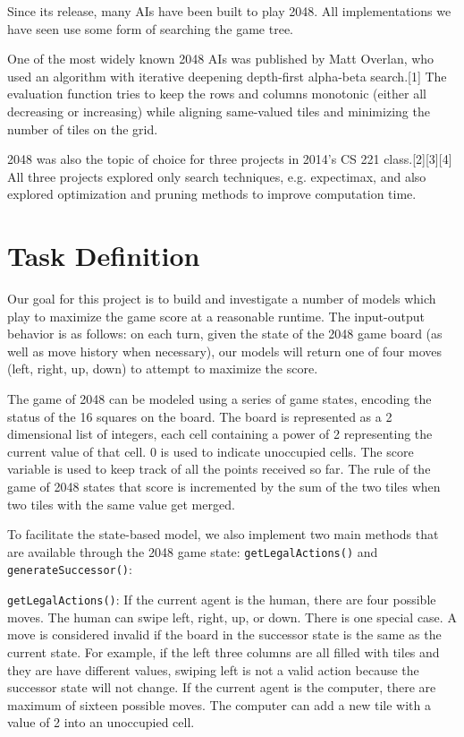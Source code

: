 \documentclass[9pt,twocolumn]{article}
\begin{document}
Since its release, many AIs have been built to play 2048. All implementations we have seen use some form of searching the game tree.

One of the most widely known 2048 AIs was published by Matt Overlan, who used an algorithm with iterative deepening depth-first alpha-beta search.[1] The evaluation function tries to keep the rows and columns monotonic (either all decreasing or increasing) while aligning same-valued tiles and minimizing the number of tiles on the grid.

2048 was also the topic of choice for three projects in 2014's CS 221 class.[2][3][4] All three projects explored only search techniques, e.g. expectimax, and also explored optimization and pruning methods to improve computation time.

\section{Task Definition}

Our goal for this project is to build and investigate a number of models which play to maximize the game score at a reasonable runtime. The input-output behavior is as follows: on each turn, given the state of the 2048 game board (as well as move history when necessary), our models will return one of four moves (left, right, up, down) to attempt to maximize the score.

The game of 2048 can be modeled using a series of game states, encoding the status of the 16 squares on the board. The board is represented as a 2 dimensional list of integers, each cell containing a power of 2 representing the current value of that cell. 0 is used to indicate unoccupied cells. The score variable is used to keep track of all the points received so far. The rule of the game of 2048 states that score is incremented by the sum of the two tiles when two tiles with the same value get merged.

To facilitate the state-based model, we also implement two main methods that are available through the 2048 game state: \texttt{getLegalActions()} and \texttt{generateSuccessor()}:

\texttt{getLegalActions()}: If the current agent is the human, there are four possible moves. The human can swipe left, right, up, or down. There is one special case. A move is considered invalid if the board in the successor state is the same as the current state. For example, if the left three columns are all filled with tiles and they are have different values, swiping left is not a valid action because the successor state will not change. If the current agent is the computer, there are maximum of sixteen possible moves. The computer can add a new tile with a value of 2 into an unoccupied cell.
\end{document}
